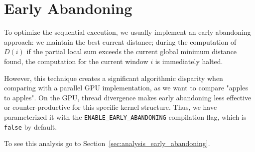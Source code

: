 \section{Early Abandoning}
\label{sec:seq_earling_abandoning}
To optimize the sequential execution, we usually implement an early abandoning approach: we maintain the best current distance; during the computation of $D(i)$ if the partial local sum exceeds the current global minimum distance found, the computation for the current window $i$ is immediately halted.

However, this technique creates a significant algorithmic disparity when comparing with a parallel GPU implementation, as we want to compare "apples to apples". On the GPU, thread divergence makes early abandoning less effective or counter-productive for this specific kernel structure. Thus, we have parameterized it with the \texttt{ENABLE\_EARLY\_ABANDONING} compilation flag, which is \texttt{false} by default.

To see this analysis go to Section~\ref{sec:analysis_early_abandoning}.